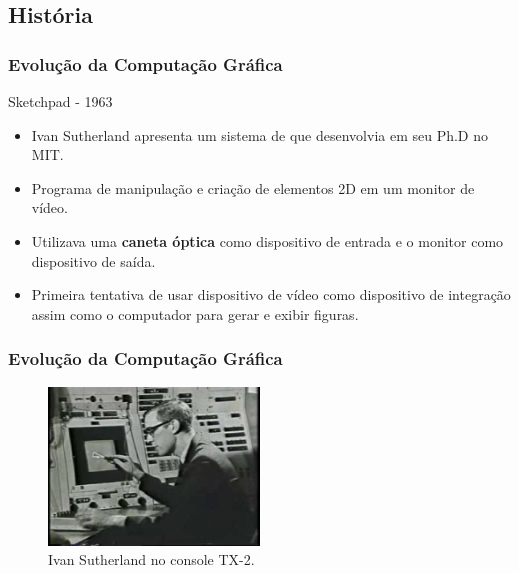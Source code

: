 \documentclass{beamer}
\begin{document}
\subsection{História}
\begin{frame}
\frametitle{Evolução da Computação Gráfica}

\begin{block}{Sketchpad - 1963}
	\begin{itemize}
		\item<1-> Ivan Sutherland apresenta um sistema de que desenvolvia em seu Ph.D no MIT.
		\item<1-> Programa de manipulação e criação de elementos 2D em um monitor de vídeo.
		\item<1-> Utilizava uma \textbf{caneta óptica} como dispositivo de entrada e o monitor como dispositivo de saída.
		
		\item<1-> Primeira tentativa de usar dispositivo de vídeo como dispositivo de integração assim como o computador para gerar e exibir figuras.
	\end{itemize}
	
\end{block}

\end{frame}



\begin{frame}
\frametitle{Evolução da Computação Gráfica}
	\begin{figure}[!h]
			\begin{center}
			\includegraphics[width=0.5\textwidth]{Figures/ivan}
			\caption{Ivan Sutherland no console TX-2.}\label{ivan}
			\end{center}
	\end{figure}
\end{frame}

\end{document}
